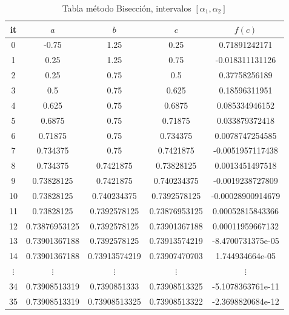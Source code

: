 \documentclass{article} %
\begin{document}
\begin{table}[H]
    \centering
    \begin{tabular}{|c|c|c|c|c|}
    \hline
it & $a$ & $b$ & $c$ & $f(c)$\\
\hline
0 & -0.75 & 1.25 & 0.25 & 0.71891242171\\
1 & 0.25 & 1.25 & 0.75 & -0.018311131126\\
2 & 0.25 & 0.75 & 0.5 & 0.37758256189\\
3 & 0.5 & 0.75 & 0.625 & 0.18596311951\\
4 & 0.625 & 0.75 & 0.6875 & 0.085334946152\\
5 & 0.6875 & 0.75 & 0.71875 & 0.033879372418\\
6 & 0.71875 & 0.75 & 0.734375 & 0.0078747254585\\
7 & 0.734375 & 0.75 & 0.7421875 & -0.0051957117438\\
8 & 0.734375 & 0.7421875 & 0.73828125 & 0.0013451497518\\
9 & 0.73828125 & 0.7421875 & 0.740234375 & -0.0019238727809\\
10 & 0.73828125 & 0.740234375 & 0.7392578125 & -0.00028900914679\\
11 & 0.73828125 & 0.7392578125 & 0.73876953125 & 0.00052815843366\\
12 & 0.73876953125 & 0.7392578125 & 0.73901367188 & 0.00011959667132\\
13 & 0.73901367188 & 0.7392578125 & 0.73913574219 & -8.4700731375e-05\\
14 & 0.73901367188 & 0.73913574219 & 0.73907470703 & 1.744934664e-05\\
$\vdots$ & $\vdots$ & $\vdots$ & $\vdots$ & $\vdots$\\
34 & 0.73908513319 & 0.7390851333 & 0.73908513325 & -5.1078363761e-11\\
35 & 0.73908513319 & 0.73908513325 & 0.73908513322 & -2.3698820684e-12\\
\hline
\end{tabular}
    \caption{Tabla método Bisección, intervalos $[\alpha_1,\alpha_2]$}
    \label{tab1}
\end{table}
\end{document}
